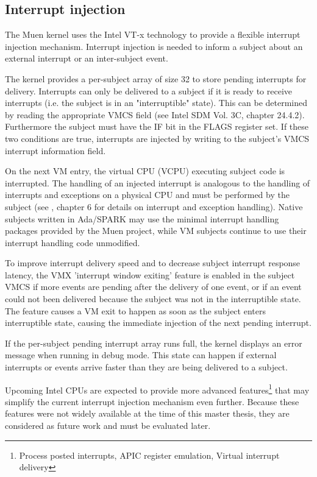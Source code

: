 \subsection{Interrupt injection}\label{subsec:int-injection}
The Muen kernel uses the Intel VT-x technology to provide a flexible interrupt
injection mechanism. Interrupt injection is needed to inform a subject about an
external interrupt or an inter-subject event.

The kernel provides a per-subject array of size 32 to store pending interrupts
for delivery.  Interrupts can only be delivered to a subject if it is ready to
receive interrupts (i.e. the subject is in an "interruptible" state). This can
be determined by reading the appropriate VMCS field (see Intel SDM
\cite{IntelSDM} Vol. 3C, chapter 24.4.2). Furthermore the subject must have the
IF bit in the FLAGS register set. If these two conditions are true, interrupts
are injected by writing to the subject's VMCS interrupt information field.

On the next VM entry, the virtual CPU (VCPU) executing subject code
is interrupted. The handling of an injected interrupt is analogous to the
handling of interrupts and exceptions on a physical CPU and must be performed by
the subject (see \cite{IntelSDM}, chapter 6 for details on interrupt and
exception handling). Native subjects written in Ada/SPARK may use the minimal
interrupt handling packages provided by the Muen project, while VM subjects
continue to use their interrupt handling code unmodified.

To improve interrupt delivery speed and to decrease subject interrupt response
latency, the VMX 'interrupt window exiting' feature is enabled in the subject
VMCS if more events are pending after the delivery of one event, or if an event
could not been delivered because the subject was not in the interruptible
state. The feature causes a VM exit to happen as soon as the subject enters
interruptible state, causing the immediate injection of the next pending
interrupt.

If the per-subject pending interrupt array runs full, the kernel displays an
error message when running in debug mode. This state can happen if external
interrupts or events arrive faster than they are being delivered to a subject.

Upcoming Intel CPUs are expected to provide more advanced
features\footnote{Process posted interrupts, APIC register emulation, Virtual
interrupt delivery} that may simplify the current interrupt injection mechanism
even further. Because these features were not widely available at the time of
this master thesis, they are considered as future work and must be evaluated
later.
